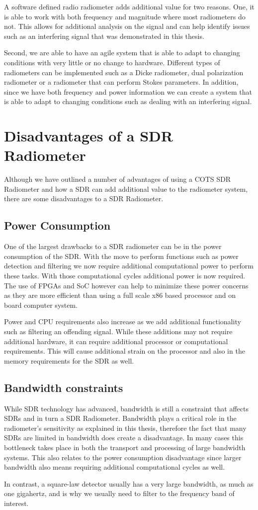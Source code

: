 A software defined radio radiometer adds additional value for two reasons.  One, it is able to work with both frequency and magnitude where most radiometers do not.  This allows for additional analysis on the signal and can help identify issues such as an interfering signal that was demonstrated in this thesis.  

Second, we are able to have an agile system that is able to adapt to changing conditions with very little or no change to hardware.  Different types of radiometers can be implemented such as a Dicke radiometer, dual polarization radiometer or a radiometer that can perform Stokes parameters.  In addition, since we have both frequency and power information we can create a system that is able to adapt to changing conditions such as dealing with an interfering signal.  

\section{Disadvantages of a SDR Radiometer}
Although we have outlined a number of advantages of using a COTS SDR Radiometer and how a SDR can add additional value to the radiometer system, there are some disadvantages to a SDR Radiometer.

\subsection{Power Consumption}
One of the largest drawbacks to a SDR radiometer can be in the power consumption of the SDR.  With the move to perform functions such as power detection and filtering we now require additional computational power to perform these tasks.  With those computational cycles additional power is now required.  The use of FPGAs and SoC however can help to minimize these power concerns as they are more efficient than using a full scale x86 based processor and on board computer system.  

Power and CPU requirements also increase as we add additional functionality such as filtering an offending signal.  While these additions may not require additional hardware, it can require additional processor or computational requirements.  This will cause additional strain on the processor and also in the memory requirements for the SDR as well.

\subsection{Bandwidth constraints}
While SDR technology has advanced, bandwidth is still a constraint that affects SDRs and in turn a SDR Radiometer.  Bandwidth plays a critical role in the radiometer's sensitivity as explained in this thesis, therefore the fact that many SDRs are limited in bandwidth does create a disadvantage.  In many cases this bottleneck takes place in both the transport and processing of large bandwidth systems.  This also relates to the power consumption disadvantage since larger bandwidth also means requiring additional computational cycles as well.  

In contrast, a square-law detector usually has a very large bandwidth, as much as one gigahertz, and is why we usually need to filter to the frequency band of interest.  